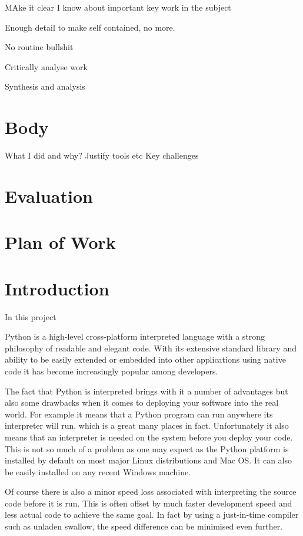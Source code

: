 \documentclass{report}
\begin{document}
MAke it clear I know about important key work in the subject

Enough detail to make self contained, no more.

No routine bullshit

Critically analyse work

Synthesis and analysis

\section{Body}

What I did and why?
Justify tools etc
Key challenges

\section{Evaluation}



\section{Plan of Work}

\section{Introduction}

In this project

Python is a high-level cross-platform interpreted language with a
strong philosophy of readable and elegant code. With its extensive
standard library and ability to be easily extended or embedded into
other applications using native code it has become increasingly
popular among developers.

The fact that Python is interpreted brings with it a number of
advantages but also some drawbacks when it comes to deploying your
software into the real world. For example it means that a Python
program can run anywhere its interpreter will run, which is a great
many places in fact. Unfortunately it also means that an
interpreter is needed on the system before you deploy your code.
This is not so much of a problem as one may expect as the Python
platform is installed by default on most major Linux distributions
and Mac OS. It can also be easily installed on any recent Windows
machine.

Of course there is also a minor speed loss associated with
interpreting the source code before it is run. This is often offset
by much faster development speed and less actual code to achieve
the same goal. In fact by using a just-in-time compiler such as
unladen swallow, the speed difference can be minimised even
further.
\end{document}
